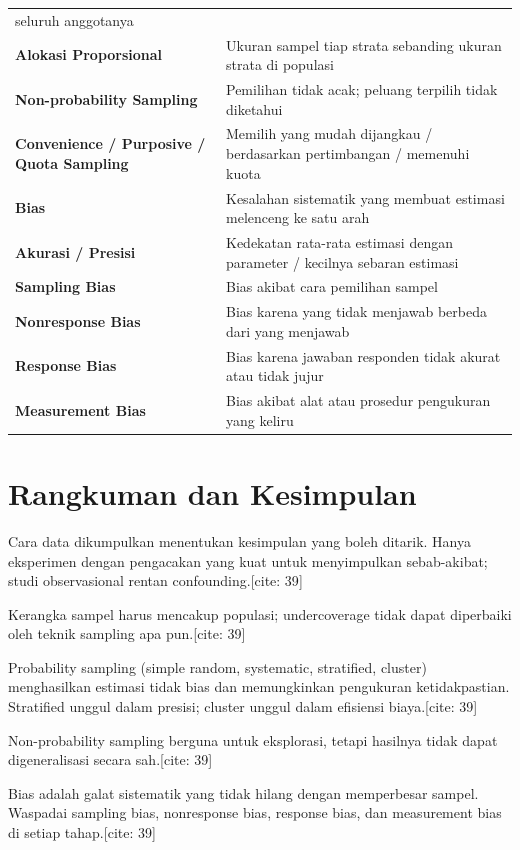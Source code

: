 \documentclass[
  indonesian,
  letterpaper,
]{book}
\begin{document}
{\begin{longtable}[]{@{}
  >{\raggedright\arraybackslash}p{}
  >{\raggedright\arraybackslash}p{}@{}}
seluruh anggotanya \\
\textbf{Alokasi Proporsional} & Ukuran sampel tiap strata sebanding
ukuran strata di populasi \\
\textbf{Non-probability Sampling} & Pemilihan tidak acak; peluang
terpilih tidak diketahui \\
\textbf{Convenience / Purposive / Quota Sampling} & Memilih yang mudah
dijangkau / berdasarkan pertimbangan / memenuhi kuota \\
\textbf{Bias} & Kesalahan sistematik yang membuat estimasi melenceng ke
satu arah \\
\textbf{Akurasi / Presisi} & Kedekatan rata-rata estimasi dengan
parameter / kecilnya sebaran estimasi \\
\textbf{Sampling Bias} & Bias akibat cara pemilihan sampel \\
\textbf{Nonresponse Bias} & Bias karena yang tidak menjawab berbeda dari
yang menjawab \\
\textbf{Response Bias} & Bias karena jawaban responden tidak akurat atau
tidak jujur \\
\textbf{Measurement Bias} & Bias akibat alat atau prosedur pengukuran
yang keliru \\
\end{longtable}
}

\section{Rangkuman dan Kesimpulan}\label{rangkuman-dan-kesimpulan-2}

Cara data dikumpulkan menentukan kesimpulan yang boleh ditarik. Hanya
eksperimen dengan pengacakan yang kuat untuk menyimpulkan sebab-akibat;
studi observasional rentan confounding.{[}cite: 39{]}

Kerangka sampel harus mencakup populasi; undercoverage tidak dapat
diperbaiki oleh teknik sampling apa pun.{[}cite: 39{]}

Probability sampling (simple random, systematic, stratified, cluster)
menghasilkan estimasi tidak bias dan memungkinkan pengukuran
ketidakpastian. Stratified unggul dalam presisi; cluster unggul dalam
efisiensi biaya.{[}cite: 39{]}

Non-probability sampling berguna untuk eksplorasi, tetapi hasilnya tidak
dapat digeneralisasi secara sah.{[}cite: 39{]}

Bias adalah galat sistematik yang tidak hilang dengan memperbesar
sampel. Waspadai sampling bias, nonresponse bias, response bias, dan
measurement bias di setiap tahap.{[}cite: 39{]}
\end{document}
